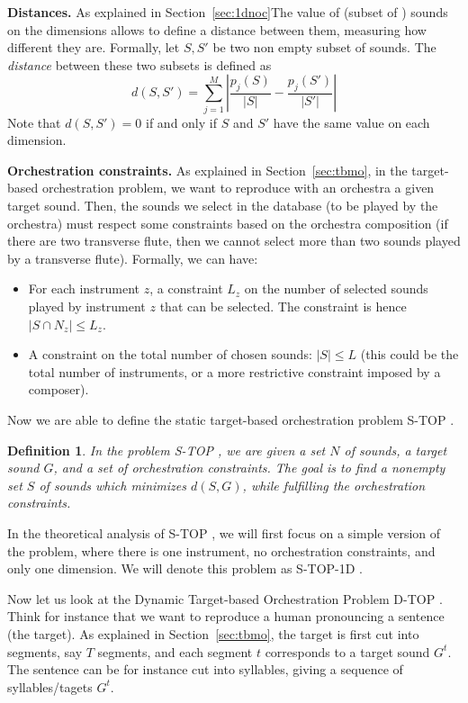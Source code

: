 \documentclass[a4paper]{book}
\newtheorem{definition}{Definition}
\newcommand{\stat}{{\sc S-TOP }}
\newcommand{\statoned}{{\sc S-TOP-1D }}
\newcommand{\dyn}{{\sc D-TOP }}
\begin{document}
{\bf Distances.} As explained in Section~\ref{sec:1dnoc}The value of (subset of ) sounds on the dimensions allows to define a distance between them, measuring how different they are. Formally, let $S,S'$ be two non empty subset of sounds. The {\it distance} between these two subsets is defined as $$d(S,S')=\sum_{j=1}^M \left| \frac{p_j(S)}{|S|} - \frac{p_j(S')}{|S'|}\right|$$
Note that $d(S,S')=0$ if and only if $S$ and $S'$ have the same value on each dimension.

{\bf Orchestration constraints.} As explained in Section~\ref{sec:tbmo}, in the target-based orchestration problem, we want to reproduce with an orchestra a given target sound. Then, the sounds we select in the database (to be played by the orchestra) must respect some constraints based on the orchestra composition (if there are two transverse flute, then we cannot select more than two sounds played by a transverse flute). Formally, we can have:
\begin{itemize}
    \item For each instrument $z$, a constraint $L_z$ on the number of selected sounds played by instrument $z$ that can be selected. The constraint is hence $|S\cap N_z|\leq L_z$.
    \item A constraint on the total number of chosen sounds: $|S|\leq L$ (this could be the total number of instruments, or a more restrictive constraint imposed by a composer).
\end{itemize}


Now we are able to define the static target-based orchestration problem \stat.

\begin{definition}
In the problem \stat, we are given a set $N$ of sounds, a target sound $G$, and a set of orchestration constraints. The goal is to find a nonempty set $S$ of sounds which minimizes $d(S,G)$, while fulfilling the orchestration constraints.
\end{definition}

In the theoretical analysis of \stat, we will first focus on a simple version of the problem, where there is one instrument, no orchestration constraints, and only one dimension. We will denote this problem as \statoned.  


Now let us look at the Dynamic Target-based Orchestration Problem \dyn. Think for instance that we want to reproduce a human pronouncing a sentence (the target). As explained in Section~\ref{sec:tbmo}, the target is first cut into segments, say $T$ segments, and each segment $t$ corresponds to a target sound $G^t$. The sentence can be for instance cut into syllables, giving a sequence of syllables/tagets $G^t$. 
\end{document}
